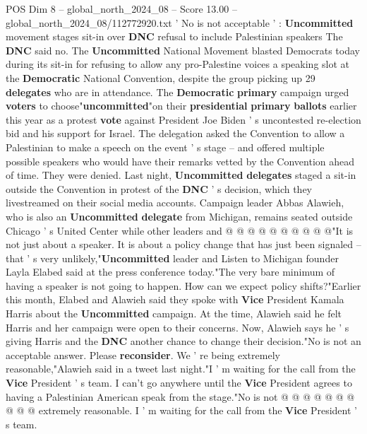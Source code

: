 \begin{textsample}{POS Dim 8 – global\_north\_2024\_08 – Score 13.00 – global\_north\_2024\_08/112772920.txt}  \label{ex:f8_pos_040}
' No is not acceptable ' : \textbf{Uncommitted} movement stages sit-in over \textbf{DNC} refusal to include Palestinian speakers The \textbf{DNC} said no.
The \textbf{Uncommitted} National Movement blasted Democrats today during its sit-in for refusing to allow any pro-Palestine voices a speaking slot at the \textbf{Democratic} National Convention, despite the group picking up 29 \textbf{delegates} who are in attendance.
The \textbf{Democratic} \textbf{primary} campaign urged \textbf{voters} to choose"\textbf{uncommitted}"on their \textbf{presidential} \textbf{primary} \textbf{ballots} earlier this year as a protest \textbf{vote} against President Joe Biden ' s uncontested re-election bid and his support for Israel.
The delegation asked the Convention to allow a Palestinian to make a speech on the event ' s stage -- and offered multiple possible speakers who would have their remarks vetted by the Convention ahead of time.
They were denied.
Last night, \textbf{Uncommitted} \textbf{delegates} staged a sit-in outside the Convention in protest of the \textbf{DNC} ' s decision, which they livestreamed on their social media accounts.
Campaign leader Abbas Alawieh, who is also an \textbf{Uncommitted} \textbf{delegate} from Michigan, remains seated outside Chicago ' s United Center while other leaders and @ @ @ @ @ @ @ @ @ @"It is not just about a speaker.
It is about a policy change that has just been signaled -- that ' s very unlikely,"\textbf{Uncommitted} leader and Listen to Michigan founder Layla Elabed said at the press conference today."The very bare minimum of having a speaker is not going to happen.
How can we expect policy shifts?"Earlier this month, Elabed and Alawieh said they spoke with \textbf{Vice} President Kamala Harris about the \textbf{Uncommitted} campaign.
At the time, Alawieh said he felt Harris and her campaign were open to their concerns.
Now, Alawieh says he ' s giving Harris and the \textbf{DNC} another chance to change their decision."No is not an acceptable answer.
Please \textbf{reconsider}.
We ' re being extremely reasonable,"Alawieh said in a tweet last night."I ' m waiting for the call from the \textbf{Vice} President ' s team.
I can't go anywhere until the \textbf{Vice} President agrees to having a Palestinian American speak from the stage."No is not @ @ @ @ @ @ @ @ @ @ extremely reasonable.
I ' m waiting for the call from the \textbf{Vice} President ' s team.

\end{textsample}
